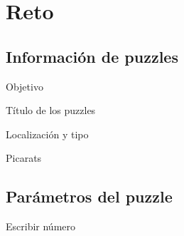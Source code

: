 \section{Reto}
\subsection{Información de puzzles}
\begin{frame}{Objetivo}
\end{frame}

\begin{frame}{Título de los puzzles}
\end{frame}

\begin{frame}{Localización y tipo}
\end{frame}

\begin{frame}{Picarats}
\end{frame}

\subsection{Parámetros del puzzle}
\begin{frame}{Escribir número}
\end{frame}

